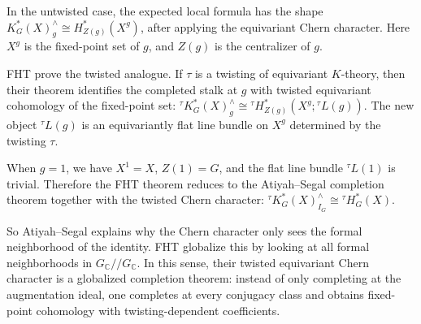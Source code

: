 \documentclass[12pt]{article}
\begin{document}
In the untwisted case, the expected local formula has the shape
$K_G^*(X)^{\wedge}_g \cong H_{Z(g)}^*(X^g)$,
after applying the equivariant Chern character. Here $X^g$ is the fixed-point
set of $g$, and $Z(g)$ is the centralizer of $g$.

FHT prove the twisted analogue. If $\tau$ is a twisting of equivariant
$K$-theory, then their theorem identifies the completed stalk at $g$ with
twisted equivariant cohomology of the fixed-point set:
${}^{\tau}K_G^*(X)^{\wedge}_g
\cong
{}^{\tau}H_{Z(g)}^*(X^g;{}^{\tau}L(g))$.
The new object ${}^{\tau}L(g)$ is an equivariantly flat line bundle on $X^g$
determined by the twisting $\tau$.

When $g=1$, we have $X^1=X$, $Z(1)=G$, and the flat line bundle
${}^{\tau}L(1)$ is trivial. Therefore the FHT theorem reduces to the
Atiyah--Segal completion theorem together with the twisted Chern character:
${}^{\tau}K_G^*(X)^{\wedge}_{I_G}\cong {}^{\tau}H_G^*(X)$.

So Atiyah--Segal explains why the Chern character only sees the formal
neighborhood of the identity. FHT globalize this by looking at all formal
neighborhoods in $G_\mathbb C//G_\mathbb C$. In this sense, their twisted
equivariant Chern character is a globalized completion theorem: instead of
only completing at the augmentation ideal, one completes at every conjugacy
class and obtains fixed-point cohomology with twisting-dependent coefficients.
\end{document}
